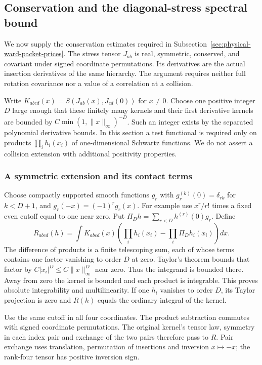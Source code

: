 \subsection{Conservation and the diagonal-stress spectral bound}
\label{sec:physical-ward-stress-cone}

We now supply the conservation estimates required in
Subsection~\ref{sec:physical-ward-packet-prices}. The stress tensor $J_{ab}$
is real, symmetric, conserved, and covariant under signed coordinate
permutations. Its derivatives are the actual insertion derivatives of the
same hierarchy. The argument requires neither full rotation covariance nor
a value of a correlation at a collision.

Write $K_{abcd}(x)=S(J_{ab}(x),J_{cd}(0))$ for $x\ne0$.
Choose one positive integer $D$ large enough that these finitely many
kernels and their first derivative kernels are bounded by
$C\min(1,\|x\|_\infty)^{-D}$. Such an integer exists by the separated
polynomial derivative bounds. In this section a test functional is required
only on products $\prod_i h_i(x_i)$ of one-dimensional Schwartz functions.
We do not assert a collision extension with additional positivity properties.

\subsubsection{A symmetric extension and its contact terms}

Choose compactly supported smooth functions $g_r$ with
$g_r^{(k)}(0)=\delta_{rk}$ for $k<D+1$, and
$g_r(-x)=(-1)^r g_r(x)$. For example use $x^r/r!$ times a fixed even
cutoff equal to one near zero. Put
$\Pi_D h=\sum_{r<D}h^{(r)}(0)g_r$. Define
\[
 R_{abcd}(h)=\int K_{abcd}(x)
       \left(\prod_i h_i(x_i)-\prod_i\Pi_Dh_i(x_i)\right)dx.
\]
The difference of products is a finite telescoping sum, each of whose
terms contains one factor vanishing to order $D$ at zero. Taylor's theorem
bounds that factor by $C|x_i|^D\leq C\|x\|_\infty^D$ near zero.
Thus the integrand is bounded there. Away from zero the kernel is bounded
and each product is integrable. This proves absolute integrability and
multilinearity. If one $h_i$ vanishes to order $D$, its Taylor projection
is zero and $R(h)$ equals the ordinary integral of the kernel.

Use the same cutoff in all four coordinates. The product subtraction
commutes with signed coordinate permutations. The original kernel's tensor
law, symmetry in each index pair and exchange of the two pairs therefore
pass to $R$. Pair exchange uses translation, permutation of insertions and
inversion $x\mapsto-x$; the rank-four tensor has positive inversion sign.

